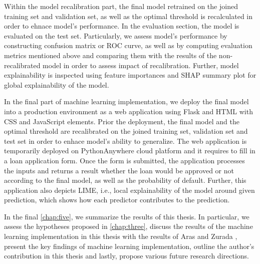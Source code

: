 Within the model recalibration part, the final model retrained on the joined training set and validation set, as well as the optimal threshold is recalculated in order to ehnace model's performance.
In the evaluation section, the model is evaluated on the test set. Particularly, we assess model's performance by constructing confusion matrix or ROC curve, as well as by computing evaluation metrics mentioned above and comparing them with the results of the non-recalibrated model in order to assess impact of recalibration. Further, model explainability is inspected using feature importances and SHAP summary plot for global explainability of the model.

In the final part of machine learning implementation, we deploy the final model into a production environment as a web application using Flask and HTML with CSS and JavaScript elements. Prior the deployment, the final model and the optimal threshold are recalibrated on the joined training set, validation set and test set in order to enhace model's ability to generalize. 
The web application is temporarily deployed on PythonAnywhere cloud platform and it requires to fill in a loan application form. Once the form is submitted, the application processes the inputs and returns a result whether the loan would be approved or not according to the final model, as well as the probability of default. Further, this application also depicts LIME, i.e., local explainability of the model around given prediction, which shows how each predictor contributes to the prediction.

In the final \autoref{chap:five}, we summarize the results of this thesis. In particular, we assess the hypotheses proposed in \autoref{chap:three}, discuss the results of the machine learning implementation in this thesis with the results of Aras \citep{serkan2021bagging} and Zurada \citep{zurada2014classification}, present the key findings of machine learning implementation, outline the author's contribution in this thesis and lastly, propose various future research directions.

